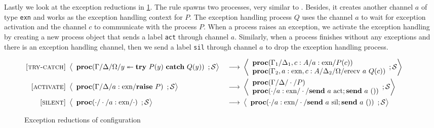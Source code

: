 \documentclass[12pt, openany]{memoir}
\newcommand*{\send}[2]{\textbf{send}\ #1\ #2}
\newcommand*{\craise}[1]{\textbf{raise}\ #1}
\newcommand*{\trycatch}[3]{#3 \twoheadleftarrow	\textbf{try}\ #1(#3)\ \textbf{catch}\ #2(#3)}
\newcommand*{\procObj}[4]{\textbf{proc}(#1/#2/#3/#4)}
\newcommand*{\cancelSet}[0]{\mathcal{S}}
\begin{document}
Lastly we look at the exception reductions in \cref{fig:exnreduction}. The  rule 
spawns two processes, very similar to .
Besides, it creates another channel $a$ of type \texttt{exn} and works as the exception handling context for $P$.
The exception handling process $Q$ uses the channel $a$ to wait for exception activation and 
the channel $c$ to communicate with the process $P$. When a process raises an exception, 
we activate the exception handling by creating a new process object that sends a label \texttt{act} through channel $a$.
Similarly, when a process finishes without any exceptions and there is an exception handling channel, then
we send a label \texttt{sil} through channel $a$ to drop the exception handling process.
\begin{figure}[H]
  \begin{alignat}{4}
    \label{try-catch} \textsc{[try-catch]} & ~ 
    \Braket{
      \begin{array}{l}
        \procObj{\Gamma}{\Delta}{\Omega}{\trycatch{P}{Q}{y}}
      \end{array}
      ; \cancelSet
    } & ~ \longrightarrow & ~ 
    \Braket{
      \begin{array}{l}
        \procObj{\Gamma_1}{\Delta_1, c : A}{a : \text{exn}}{P(c)} \\
        \procObj{\Gamma_2, a : \text{exn}, c : A}{\Delta_2}{\Omega}{\text{erecv}\ a\ Q(c)}
      \end{array}
      ; \cancelSet
    } \tag*{} \\
    \label{activation} \textsc{[activate]} & ~ 
    \Braket{
      \begin{array}{l}
        \procObj{\Gamma}{\Delta}{a : \text{exn}}{\craise{P}}
      \end{array}
      ; \cancelSet
    } & ~ \longrightarrow & ~ 
    \Braket{
      \begin{array}{l}
        \procObj{\Gamma}{\Delta}{\cdot}{P} \\
        \procObj{\cdot}{a : \text{exn}}{\cdot}{\send{a}{\text{act}}; \send{a}{()}}
      \end{array}
      ; \cancelSet
    } \tag*{} \\
    \label{silence} \textsc{[silent]} & ~ 
    \Braket{
      \begin{array}{l}
        \procObj{\cdot}{\cdot}{a : \text{exn}}{\cdot}
      \end{array}
      ; \cancelSet
    } & ~ \longrightarrow & ~ 
    \Braket{
      \begin{array}{l}
        \procObj{\cdot}{a : \text{exn}}{\cdot}{\send{a}{\text{sil}}; \send{a}{()}}
      \end{array}
      ; \cancelSet
    } \tag*{}
  \end{alignat}
  \raggedleft
  \caption{Exception reductions of configuration}
  \label{fig:exnreduction}
\end{figure}
\end{document}
